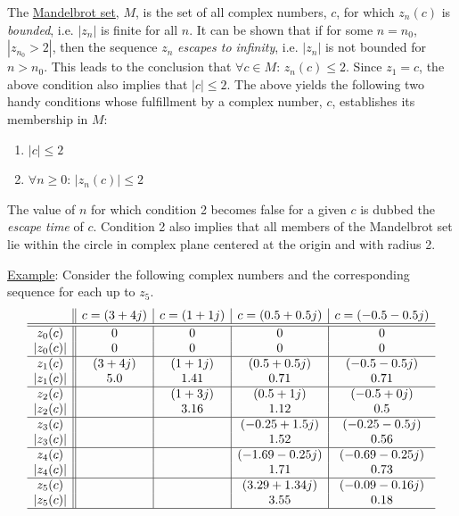 \documentclass[addpoints]{exam}
\begin{document}
\begin{questions}
The \href{http://en.wikipedia.org/wiki/Mandelbrot_set}{Mandelbrot set}, $M$, is the set of all complex numbers, $c$, for which $z_n(c)$ is \textit{bounded}, i.e. $|z_n|$ is finite for all $n$. It can be shown that if for some $n = n_0$, $|z_{n_0} > 2|$, then the sequence $z_n$ {\it escapes to infinity}, i.e. $|z_n|$ is not bounded for $n > n_0$. This leads to the conclusion that $\forall c \in M:\, z_n(c) \leq 2$. Since $z_1 = c$, the above condition also implies that $|c| \leq 2$.
The above yields the following two handy conditions whose fulfillment by a complex number, $c$, establishes its membership in $M$:
\begin{enumerate}
\item $|c|\leq 2$
\item $\forall n\geq 0:\, |z_n(c)|\leq 2$
\end{enumerate}
The value of $n$ for which condition 2 becomes false for a given $c$ is dubbed the {\it escape time} of $c$. Condition 2 also implies that all members of the Mandelbrot set lie within the circle in complex plane centered at the origin and with radius 2.

\underline{Example}: Consider the following complex numbers and the corresponding sequence for each up to $z_5$.
\[
  \begin{array}{c|*{4}{|c}}
 & c=(3+4j) & c=(1+1j) & c=(0.5+0.5j) & c=(-0.5-0.5j)\\\hline\hline
z_0(c) & 0 & 0 & 0 & 0\\
|z_0(c)| & 0 & 0 & 0 & 0\\\hline
z_1(c) & (3+4j) & (1+1j) & (0.5+0.5j) & (-0.5-0.5j)\\
|z_1(c)| & 5.0 & 1.41 & 0.71 & 0.71\\\hline
z_2(c) &  & (1+3j) & (0.5+1j) & (-0.5+0j)\\
|z_2(c)| &  & 3.16 & 1.12 & 0.5\\\hline
z_3(c) &  &  & (-0.25+1.5j) & (-0.25-0.5j)\\
|z_3(c)| &  &  & 1.52 & 0.56\\\hline
z_4(c) &  &  & (-1.69-0.25j) & (-0.69-0.25j)\\
|z_4(c)| &  &  & 1.71 & 0.73\\\hline
z_5(c) &  &  & (3.29+1.34j) & (-0.09-0.16j)\\
|z_5(c)| &  &  & 3.55 & 0.18\\\hline
  \end{array}
  \]


\end{questions}
\end{document}
